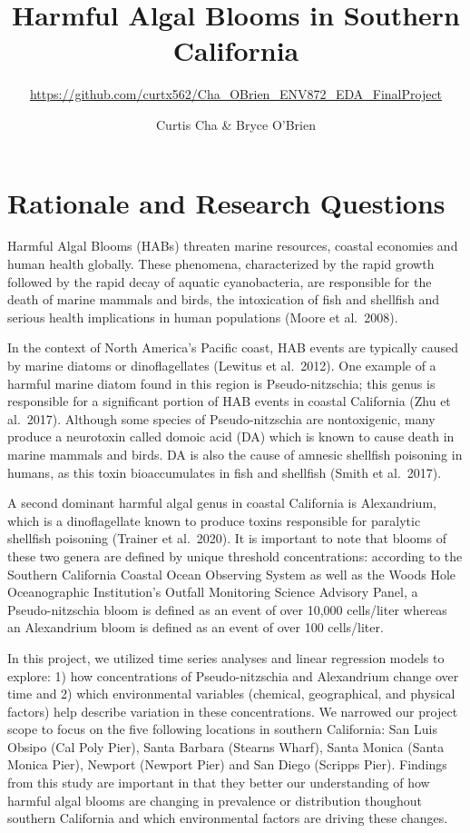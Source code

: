 \documentclass[
  12pt,
]{article}
\title{Harmful Algal Blooms in Southern California}
\subtitle{\url{https://github.com/curtx562/Cha_OBrien_ENV872_EDA_FinalProject}}
\author{Curtis Cha \& Bryce O'Brien}
\date{}
\begin{document}
\maketitle

\newpage
\tableofcontents 
\newpage
\listoftables 
\newpage
\listoffigures 
\newpage

\hypertarget{rationale-and-research-questions}{%
\section{Rationale and Research
Questions}\label{rationale-and-research-questions}}

Harmful Algal Blooms (HABs) threaten marine resources, coastal economies
and human health globally. These phenomena, characterized by the rapid
growth followed by the rapid decay of aquatic cyanobacteria, are
responsible for the death of marine mammals and birds, the intoxication
of fish and shellfish and serious health implications in human
populations (Moore et al.~2008).

In the context of North America's Pacific coast, HAB events are
typically caused by marine diatoms or dinoflagellates (Lewitus et
al.~2012). One example of a harmful marine diatom found in this region
is Pseudo-nitzschia; this genus is responsible for a significant portion
of HAB events in coastal California (Zhu et al.~2017). Although some
species of Pseudo-nitzschia are nontoxigenic, many produce a neurotoxin
called domoic acid (DA) which is known to cause death in marine mammals
and birds. DA is also the cause of amnesic shellfish poisoning in
humans, as this toxin bioaccumulates in fish and shellfish (Smith et
al.~2017).

A second dominant harmful algal genus in coastal California is
Alexandrium, which is a dinoflagellate known to produce toxins
responsible for paralytic shellfish poisoning (Trainer et al.~2020). It
is important to note that blooms of these two genera are defined by
unique threshold concentrations: according to the Southern California
Coastal Ocean Observing System as well as the Woods Hole Oceanographic
Institution's Outfall Monitoring Science Advisory Panel, a
Pseudo-nitzschia bloom is defined as an event of over 10,000 cells/liter
whereas an Alexandrium bloom is defined as an event of over 100
cells/liter.

In this project, we utilized time series analyses and linear regression
models to explore: 1) how concentrations of Pseudo-nitzschia and
Alexandrium change over time and 2) which environmental variables
(chemical, geographical, and physical factors) help describe variation
in these concentrations. We narrowed our project scope to focus on the
five following locations in southern California: San Luis Obsipo (Cal
Poly Pier), Santa Barbara (Stearns Wharf), Santa Monica (Santa Monica
Pier), Newport (Newport Pier) and San Diego (Scripps Pier). Findings
from this study are important in that they better our understanding of
how harmful algal blooms are changing in prevalence or distribution
thoughout southern California and which environmental factors are
driving these changes.
\end{document}
